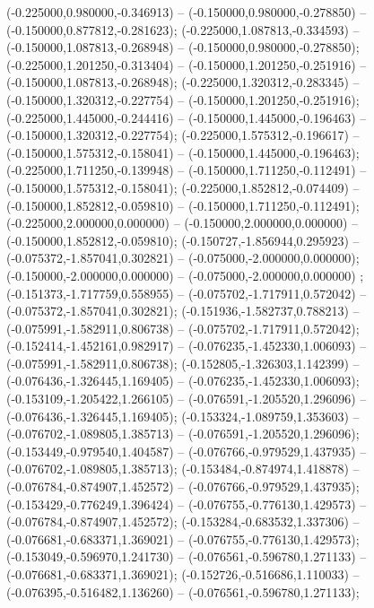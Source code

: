  (-0.225000,0.980000,-0.346913) -- (-0.150000,0.980000,-0.278850) -- (-0.150000,0.877812,-0.281623);
 (-0.225000,1.087813,-0.334593) -- (-0.150000,1.087813,-0.268948) -- (-0.150000,0.980000,-0.278850);
 (-0.225000,1.201250,-0.313404) -- (-0.150000,1.201250,-0.251916) -- (-0.150000,1.087813,-0.268948);
 (-0.225000,1.320312,-0.283345) -- (-0.150000,1.320312,-0.227754) -- (-0.150000,1.201250,-0.251916);
 (-0.225000,1.445000,-0.244416) -- (-0.150000,1.445000,-0.196463) -- (-0.150000,1.320312,-0.227754);
 (-0.225000,1.575312,-0.196617) -- (-0.150000,1.575312,-0.158041) -- (-0.150000,1.445000,-0.196463);
 (-0.225000,1.711250,-0.139948) -- (-0.150000,1.711250,-0.112491) -- (-0.150000,1.575312,-0.158041);
 (-0.225000,1.852812,-0.074409) -- (-0.150000,1.852812,-0.059810) -- (-0.150000,1.711250,-0.112491);
 (-0.225000,2.000000,0.000000) -- (-0.150000,2.000000,0.000000) -- (-0.150000,1.852812,-0.059810);
 (-0.150727,-1.856944,0.295923) -- (-0.075372,-1.857041,0.302821) -- (-0.075000,-2.000000,0.000000);
 (-0.150000,-2.000000,0.000000) -- (-0.075000,-2.000000,0.000000) ;
 (-0.151373,-1.717759,0.558955) -- (-0.075702,-1.717911,0.572042) -- (-0.075372,-1.857041,0.302821);
 (-0.151936,-1.582737,0.788213) -- (-0.075991,-1.582911,0.806738) -- (-0.075702,-1.717911,0.572042);
 (-0.152414,-1.452161,0.982917) -- (-0.076235,-1.452330,1.006093) -- (-0.075991,-1.582911,0.806738);
 (-0.152805,-1.326303,1.142399) -- (-0.076436,-1.326445,1.169405) -- (-0.076235,-1.452330,1.006093);
 (-0.153109,-1.205422,1.266105) -- (-0.076591,-1.205520,1.296096) -- (-0.076436,-1.326445,1.169405);
 (-0.153324,-1.089759,1.353603) -- (-0.076702,-1.089805,1.385713) -- (-0.076591,-1.205520,1.296096);
 (-0.153449,-0.979540,1.404587) -- (-0.076766,-0.979529,1.437935) -- (-0.076702,-1.089805,1.385713);
 (-0.153484,-0.874974,1.418878) -- (-0.076784,-0.874907,1.452572) -- (-0.076766,-0.979529,1.437935);
 (-0.153429,-0.776249,1.396424) -- (-0.076755,-0.776130,1.429573) -- (-0.076784,-0.874907,1.452572);
 (-0.153284,-0.683532,1.337306) -- (-0.076681,-0.683371,1.369021) -- (-0.076755,-0.776130,1.429573);
 (-0.153049,-0.596970,1.241730) -- (-0.076561,-0.596780,1.271133) -- (-0.076681,-0.683371,1.369021);
 (-0.152726,-0.516686,1.110033) -- (-0.076395,-0.516482,1.136260) -- (-0.076561,-0.596780,1.271133);
